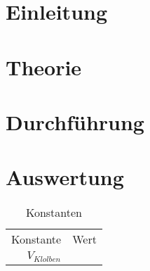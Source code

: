\documentclass[12pt, a4paper, twoside]{scrartcl}
\begin{document}

\cleardoublepage
\tableofcontents
\cleardoublepage
\setcounter{page}{1}

\section{Einleitung}
\label{sec:einleitung}

\section{Theorie}
\label{sec:theorie}


\section{Durchführung}
\label{sec:durchfuehrung}

\section{Auswertung}
\label{sec:auswertung}


\begin{table}
\centering
\begin{tabular}{r|c}
    Konstante & Wert\\
    $V_{Klolben}$ &  \\
    
 \end{tabular} 
 \caption{\label{tab:}Konstanten}
\end{table}
\end{document}
